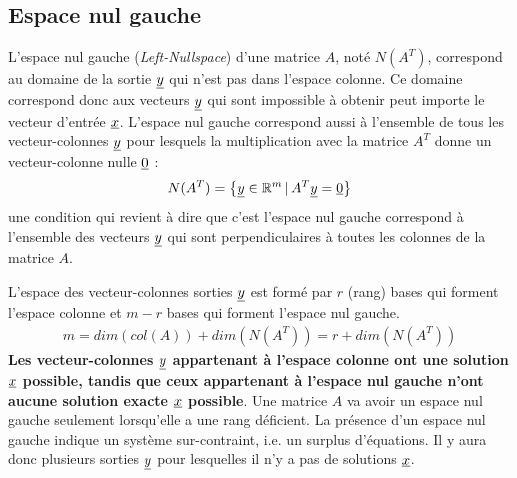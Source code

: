 \subsection{Espace nul gauche}
\label{sec:leftnullspace}

L'espace nul gauche (\textit{Left-Nullspace}) d'une matrice $A$, noté $N(A^T)$, correspond au domaine de la sortie $\underline{y}$ qui n'est pas dans l'espace colonne. Ce domaine correspond donc aux vecteurs $\underline{y}$ qui sont impossible à obtenir peut importe le vecteur d'entrée $\underline{x}$. L'espace nul gauche correspond aussi à l'ensemble de tous les vecteur-colonnes $\underline{y}$ pour lesquels la multiplication avec la matrice $A^T$ donne un vecteur-colonne nulle $\underline{0}$ :
\begin{align}
N(A^T) = \left\{ \underline{y} \in \mathbb{R}^m \,|\, A^T\underline{y} = \underline{0} \right\}
\end{align}
une condition qui revient à dire que c'est l'espace nul gauche correspond à l'ensemble des vecteurs $\underline{y}$ qui sont perpendiculaires à toutes les colonnes de la matrice $A$.


L'espace des vecteur-colonnes sorties $\underline{y}$ est formé par $r$ (rang) bases qui forment l'espace colonne et $m-r$ bases qui forment l'espace nul gauche.
\begin{align}
m     = dim( col(A) ) + dim( N(A^T) )  = r + dim( N(A^T) )
\end{align}
%
\textbf{Les vecteur-colonnes $\underline{y}$ appartenant à l'espace colonne ont une solution $\underline{x}$ possible, tandis que ceux appartenant à l'espace nul gauche n'ont aucune solution exacte $\underline{x}$ possible}.
%
Une matrice $A$ va avoir un espace nul gauche seulement lorsqu'elle a une rang déficient. La présence d'un espace nul gauche indique un système sur-contraint, i.e. un surplus d'équations. Il y aura donc plusieurs sorties $\underline{y}$ pour lesquelles il n'y a pas de solutions $\underline{x}$.


